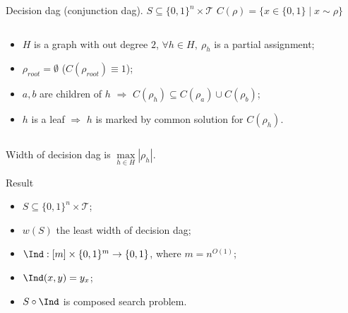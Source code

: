 \begin{frame}{Decision dag (conjunction dag). $S \subseteq \{0, 1\}^n \times \mathcal{T}$}
    $C(\rho) = \{x \in \{0, 1\} \mid x \sim \rho\}$
    
    \begin{columns}[t]
        \begin{column}{0.55\textwidth}
            \begin{itemize}
                \item $H$ is a graph with out degree $2$, $\forall h \in H, ~ {\rho}_h$ is a partial
                    assignment;
                \item $\rho_{root} = \emptyset$ ($C(\rho_{root}) \equiv 1$);
                \item $a, b$ are children of $h$ $\Rightarrow$ $C(\rho_{h}) \subseteq C(\rho_a) \cup
                    C(\rho_b)$;
                \item $h$ is a leaf $\Rightarrow$ $h$ is marked by common solution for $C(\rho_h)$.
            \end{itemize}
        \end{column}

		\begin{column}{0.4\textwidth}
            \begin{center}
                
            \end{center}
		\end{column}
	\end{columns}

    Width of decision dag is $\max\limits_{h \in H} |\rho_h|$.
\end{frame}

\begin{frame}{Result}
    \begin{itemize}
        \item $S \subseteq \{0, 1\}^n \times \mathcal{T}$;
        \item $w(S)$ the least width of decision dag;
        \pause
        \item $\Ind: [m] \times \{0, 1\}^m \to \{0, 1\}$, where $m = n^{O(1)}$;
        \item $\Ind(x, y) = y_x$;
        \pause
        \item $S \circ \Ind$ is composed search problem.
    \end{itemize}


\end{frame}